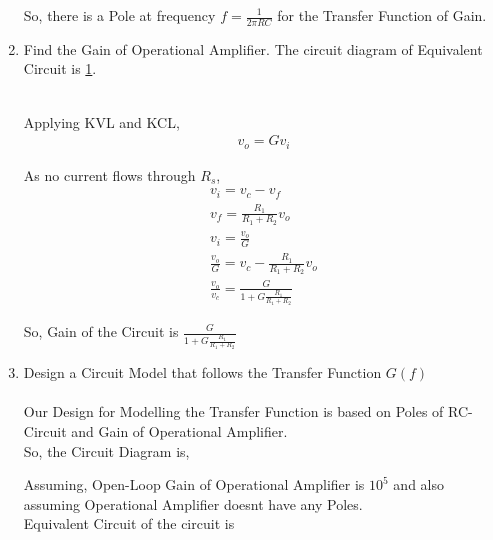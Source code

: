 \begin{enumerate}[label=\thesubsection.\arabic*.,ref=\thesubsection.\theenumi]
So, there is a Pole at frequency $f = \frac{1}{2\pi RC}$ for the Transfer Function of Gain.\\
\item Find the Gain of Operational Amplifier. The circuit diagram of Equivalent Circuit is \ref{fig:OpAmp Circuit}.
\begin{figure}[ht!]
	\begin{center}
		\resizebox{\columnwidth}{!}{}
	\end{center}
	\caption{}
	\label{fig:OpAmp Circuit}
\end{figure}

\solution\\
Applying KVL and KCL,
\begin{align}
v_{o} = Gv_{i}
\end{align}

As no current flows through $R_{s}$,
\begin{align}
v_{i} = v_{c} - v_{f}\\
v_{f} = \frac{R_{1}}{R_{1}+R_{2}}v_{o}\\
v_{i} = \frac{v_{o}}{G}\\
\frac{v_{o}}{G} = v_{c} - \frac{R_{1}}{R_{1}+R_{2}}v_{o}\\
\frac{v_{o}}{v_{c}} = \frac{G}{1+G\frac{R_{1}}{R_{1}+R_{2}}}
\end{align}

So, Gain of the Circuit is $\frac{G}{1+G\frac{R_{1}}{R_{1}+R_{2}}}$
\item Design a Circuit Model that follows the Transfer Function $G(f)$\\
\solution\\
Our Design for Modelling the Transfer Function is based on Poles of RC-Circuit and Gain of Operational Amplifier.\\

So, the Circuit Diagram is,
\begin{figure}[ht!]
	\begin{center}
		\resizebox{\columnwidth/1}{!}{}
	\end{center}
	\caption{}
	\label{fig:Open-Loop Circuit}
\end{figure}
 
Assuming, Open-Loop Gain of Operational Amplifier is $10^{5}$ and also assuming Operational Amplifier doesnt have any Poles.\\
Equivalent Circuit of the circuit is
\begin{figure}[ht!]
	\begin{center}
		\resizebox{\columnwidth/1}{!}{}
	\end{center}
	\caption{}
	\label{fig:Equivalent Open-Loop Circuit}
\end{figure}


\end{enumerate}
